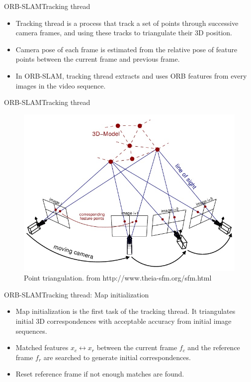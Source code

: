 \documentclass[aspectratio=169]{beamer}
\begin{document}
\begin{frame}{ORB-SLAM}{Tracking thread}
    \begin{itemize}
      \item{
      Tracking thread is a process that track a set of points through successive camera frames, and using these tracks to triangulate their 3D position.
      }
      \item{
      Camera pose of each frame is estimated from the relative pose of feature points between the current frame and previous frame.
      }
      \item{
      In ORB-SLAM, tracking thread extracts and uses ORB features from every images in the video sequence.
      }  
    \end{itemize}
\end{frame}
\begin{frame}{ORB-SLAM}{Tracking thread}
\begin{figure}
\includegraphics[scale=0.35]{figs/Triangulation}
\caption{Point triangulation. from http://www.theia-sfm.org/sfm.html}
\end{figure}
    
\end{frame}

\begin{frame}{ORB-SLAM}{Tracking thread: Map initialization}

    \begin{itemize}
    \item{
      Map initialization is the first task of the tracking thread. It triangulates initial 3D correspondences with acceptable accuracy from initial image sequences. 
      }
   \item{
   Matched features $x_{c} \leftrightarrow x_{r}$ between the current frame $f_{c}$ and the reference frame $f_{r}$ are searched to generate initial correspondences.
   }
   \item{
   Reset reference frame if not enough matches are found.
   }
   
    \end{itemize}
\end{frame}
\end{document}
